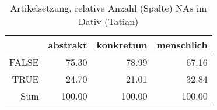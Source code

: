 \begin{table}[ht]
\centering
\begin{tabular}{rrrr}
  \hline
 & abstrakt & konkretum & menschlich \\ 
  \hline
FALSE & 75.30 & 78.99 & 67.16 \\ 
  TRUE & 24.70 & 21.01 & 32.84 \\ 
  Sum & 100.00 & 100.00 & 100.00 \\ 
   \hline
\end{tabular}
\caption{Artikelsetzung, relative Anzahl (Spalte) NAs im Dativ (Tatian)} 
\end{table}
